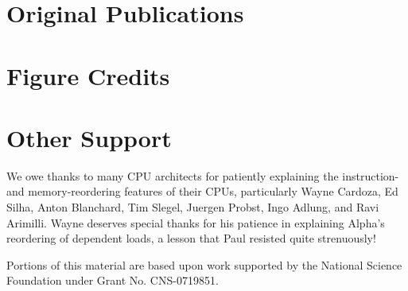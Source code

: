 \section{Original Publications}

\ListOriginalPublications

\section{Figure Credits}

\ListContributions

\section{Other Support}

We owe thanks to many CPU architects for patiently explaining the
instruction- and memory-reordering features of their CPUs, particularly
Wayne Cardoza, Ed Silha, Anton Blanchard, Tim Slegel, Juergen Probst,
Ingo Adlung, and Ravi Arimilli.
Wayne deserves special thanks for his patience in explaining Alpha's reordering
of dependent loads, a lesson that Paul resisted quite strenuously!

Portions of this material are based upon work supported by the National
Science Foundation under Grant No. CNS-0719851.
